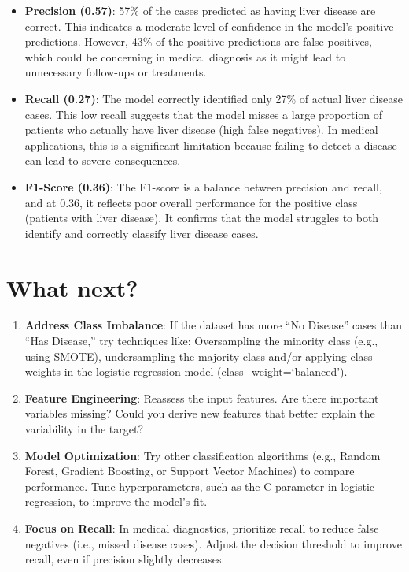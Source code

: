 \documentclass[11pt]{article}
\providecommand{\tightlist}{%
      \setlength{\itemsep}{0pt}\setlength{\parskip}{0pt}}
\begin{document}
    \begin{itemize}
\tightlist
\item
  \textbf{Precision (0.57)}: 57\% of the cases predicted as having liver
  disease are correct. This indicates a moderate level of confidence in
  the model's positive predictions. However, 43\% of the positive
  predictions are false positives, which could be concerning in medical
  diagnosis as it might lead to unnecessary follow-ups or treatments.
\item
  \textbf{Recall (0.27)}: The model correctly identified only 27\% of
  actual liver disease cases. This low recall suggests that the model
  misses a large proportion of patients who actually have liver disease
  (high false negatives). In medical applications, this is a significant
  limitation because failing to detect a disease can lead to severe
  consequences.
\item
  \textbf{F1-Score (0.36)}: The F1-score is a balance between precision
  and recall, and at 0.36, it reflects poor overall performance for the
  positive class (patients with liver disease). It confirms that the
  model struggles to both identify and correctly classify liver disease
  cases.
\end{itemize}

    \section{What next?}\label{what-next}

    \begin{enumerate}
\def\labelenumi{\arabic{enumi}.}
\tightlist
\item
  \textbf{Address Class Imbalance}: If the dataset has more ``No
  Disease'' cases than ``Has Disease,'' try techniques like:
  Oversampling the minority class (e.g., using SMOTE), undersampling the
  majority class and/or applying class weights in the logistic
  regression model (class\_weight=`balanced').
\item
  \textbf{Feature Engineering}: Reassess the input features. Are there
  important variables missing? Could you derive new features that better
  explain the variability in the target?
\item
  \textbf{Model Optimization}: Try other classification algorithms
  (e.g., Random Forest, Gradient Boosting, or Support Vector Machines)
  to compare performance. Tune hyperparameters, such as the C parameter
  in logistic regression, to improve the model's fit.
\item
  \textbf{Focus on Recall}: In medical diagnostics, prioritize recall to
  reduce false negatives (i.e., missed disease cases). Adjust the
  decision threshold to improve recall, even if precision slightly
  decreases.
\end{enumerate}
\end{document}
